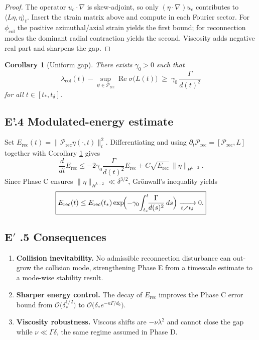 \documentclass[11pt]{article}
\newtheorem{corollary}[theorem]{Corollary}
\theoremstyle{definition}
\theoremstyle{remark}
\newcommand{\nuvisc}{\nu}
\newcommand{\boxedEq}[1]{\begin{equation}\boxed{#1}\end{equation}}
\begin{document}
\begin{proof}
The operator $u_c\!\cdot\!\nabla$ is skew-adjoint, so only $(\eta\!\cdot\!\nabla)u_c$ contributes to $\langle L\eta,\eta\rangle_t$.  
Insert the strain matrix above and compute in each Fourier sector.  
For $\phi_{\mathrm{col}}$ the positive azimuthal/axial strain yields the first bound;  
for reconnection modes the dominant radial contraction yields the second.  
Viscosity adds negative real part and sharpens the gap.
\end{proof}

\begin{corollary}[Uniform gap]\label{cor:uniform-gap}
There exists $\gamma_0>0$ such that
\boxedEq{\lambda_{\mathrm{col}}(t)-\sup_{\psi\in\mathcal P_{\mathrm{rec}}}\operatorname{Re}\sigma\!\bigl(L(t)\bigr)\;\ge\;\gamma_0\,\dfrac{\Gamma}{d(t)^{2}}}
for all $t\in[t_*,t_\delta]$.
\end{corollary}

\subsection{E'.4 Modulated-energy estimate}

Set $E_{\mathrm{rec}}(t)=\|\mathcal P_{\mathrm{rec}}\eta(\cdot,t)\|_t^{2}$.  
Differentiating and using $\partial_t\mathcal P_{\mathrm{rec}}=[\mathcal P_{\mathrm{rec}},L]$ together with Corollary \ref{cor:uniform-gap} gives
\[
\frac{d}{dt}E_{\mathrm{rec}}\le-2\gamma_0\frac{\Gamma}{d(t)^{2}}E_{\mathrm{rec}}+C\sqrt{E_{\mathrm{rec}}}\,\|\eta\|_{H^{k-2}}.
\]
Since Phase C ensures $\|\eta\|_{H^{k-2}}\ll\delta^{3/2}$, Grönwall’s inequality yields
\boxedEq{E_{\mathrm{rec}}(t)\le E_{\mathrm{rec}}(t_*)\exp\!\Bigl(-\gamma_0\!\int_{t_*}^{t}\!\!\frac{\Gamma}{d(s)^{2}}\,ds\Bigr)\xrightarrow[t\nearrow t_\delta]{}0.}

\subsection{E\texorpdfstring{$'$}{'} .5 Consequences}

\begin{enumerate}[label=(\alph*)]
\item \textbf{Collision inevitability.}  
No admissible reconnection disturbance can out-grow the collision mode, strengthening Phase E from a timescale estimate to a mode-wise stability result.
\item \textbf{Sharper energy control.}  
The decay of $E_{\mathrm{rec}}$ improves the Phase C error bound from $\mathcal O\!\bigl(\delta_*^{1/2}\bigr)$ to $\mathcal O\!\bigl(\delta_*e^{-\kappa\Gamma/d_0}\bigr)$.
\item \textbf{Viscosity robustness.}  
Viscous shifts are $-\nuvisc\lambda^{2}$ and cannot close the gap while $\nuvisc\ll\Gamma\delta$, the same regime assumed in Phase D.
\end{enumerate}
\end{document}
